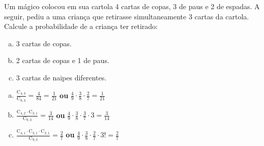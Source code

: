 \begin{ex}
Um mágico colocou em sua cartola 4 cartas de copas, 3 de paus e 2 de espadas. A seguir, pediu a uma criança que retirasse simultaneamente 3 cartas da cartola. Calcule a probabilidade de a criança ter retirado:
   \begin{enumerate}[(a)]
   \item 3 cartas de copas.
   \item 2 cartas de copas e 1 de paus.
   \item 3 cartas de naipes diferentes.
   \end{enumerate}
     \begin{sol}
        \phantom{A} 
        \begin{enumerate} [(a)]
            \item $\frac{\mathrm{C}_{4,3}}{\mathrm{C}_{9,3}}=\frac{4}{84}=\frac{1}{21}$\hspace{0,3cm} \textbf{ou}\hspace{0,3cm} $\frac{4}{9}\cdot\frac{3}{8}\cdot\frac{2}{7}=\frac{1}{21}$
            \item $\frac{\mathrm{C}_{4,2}\cdot\mathrm{C}_{3,1}}{\mathrm{C}_{9,3}}=\frac{3}{14}$\hspace{0,3cm} \textbf{ou} \hspace{0,3cm} $\frac{4}{9}\cdot\frac{3}{8}\cdot\frac{3}{7}\cdot3=\frac{3}{14}$
            \item $\frac{\mathrm{C}_{4,1}\cdot\mathrm{C}_{3,1}\cdot\mathrm{C}_{2,1}}{\mathrm{C}_{9,3}}=\frac{2}{7}$\hspace{0,3cm}\hspace{0,3cm} \textbf{ou} \hspace{0,3cm} $\frac{4}{9}\cdot\frac{3}{8}\cdot\frac{2}{7}\cdot3!=\frac{2}{7}$
        \end{enumerate}
     \end{sol}
\end{ex}